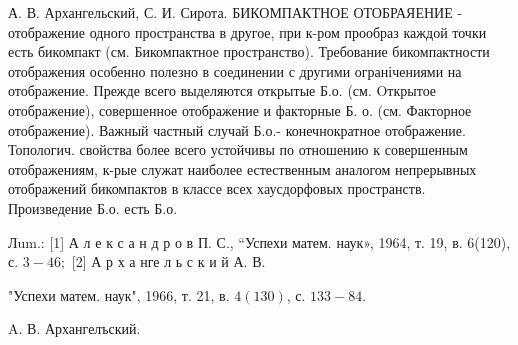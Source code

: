 \documentclass[10pt]{article}
\begin{document}
А. В. Архангельский, С. И. Сирота. БИКОМПАКТНОЕ ОТОБРАЯЕНИЕ - отображение одного пространства в другое, при к-ром прообраз каждой точки есть бикомпакт (см. Бикомпактное пространство). Требование бикомпактности отображения особенно полезно в соединении с другими огранічениями на отображение. Прежде всего выделяются открытые Б.о. (см. Oткрытое отображение), совершенное отображение и факторные Б. о. (см. Факторное отображение). Важный частный случай Б.о.- конечнократное отображение. Топологич. свойства более всего устойчивы по отношению к совершенным отображениям, к-рые служат наиболее естественным аналогом непрерывных отображений бикомпактов в классе всех хаусдорфовых пространств. Произведение Б.о. есть Б.о.



Лum.: [1] А л е к с а н д р о в П. С., “Успехи матем. наук», 1964, т. 19, в. 6(120), с. $3-46 ;$ [2] А р х а нге л ь с к и й А. В.



"Успехи матем. наук", 1966, т. 21, в. $4(130)$, с. $133-84$.

A. В. Архангелъский.
\end{document}
